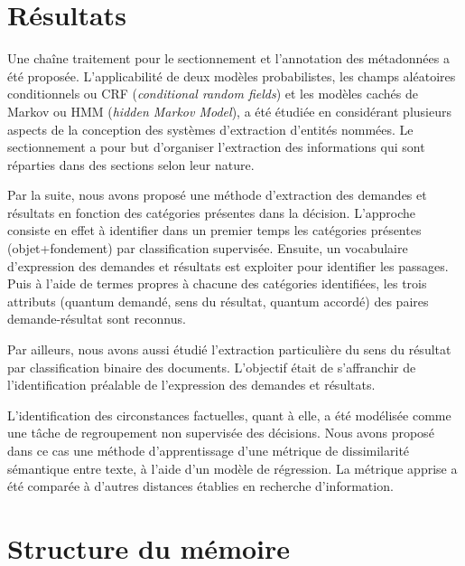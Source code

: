 \section{Résultats}
\label{sec:intro:résultats}
Une chaîne traitement pour le sectionnement et l'annotation des métadonnées a été proposée. L'applicabilité de deux modèles probabilistes, les champs aléatoires conditionnels ou CRF (\textit{conditional random fields}) et les modèles cachés de Markov ou HMM (\textit{hidden Markov Model}), a été étudiée en considérant plusieurs aspects de la conception des systèmes d'extraction d'entités nommées. Le sectionnement a pour but d'organiser l'extraction des informations qui sont réparties dans des sections selon leur nature. 

Par la suite, nous avons proposé une méthode d'extraction des demandes et résultats en fonction des catégories présentes dans la décision. L'approche consiste en effet à identifier dans un premier temps les catégories présentes (objet+fondement) par classification supervisée. Ensuite, un vocabulaire d'expression des demandes et résultats est exploiter pour identifier les passages. Puis à l'aide de termes propres à chacune des catégories identifiées, les trois attributs (quantum demandé, sens du résultat, quantum accordé) des paires demande-résultat sont reconnus. 

Par ailleurs, nous avons aussi étudié l'extraction particulière du sens du résultat par classification binaire des documents. L'objectif était de s'affranchir de l'identification préalable de l'expression des demandes et résultats. 

L'identification des circonstances factuelles, quant à elle, a été  modélisée comme une tâche de regroupement non supervisée des décisions. Nous avons proposé dans ce cas une méthode d'apprentissage d'une métrique de dissimilarité sémantique entre texte, à l'aide d'un modèle de régression. La métrique apprise a été comparée à d'autres distances établies en recherche d'information.

\section{Structure du mémoire}
\label{sec:intro:organisation}

